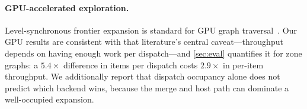 \paragraph{GPU-accelerated exploration.}
Level-synchronous frontier expansion is standard for GPU graph
traversal~\cite{Merrill12}.  Our GPU results are consistent with that
literature's central caveat---throughput depends on having enough work per
dispatch---and \cref{sec:eval} quantifies it for zone graphs: a $5.4\times$
difference in items per dispatch costs $2.9\times$ in per-item throughput.  We
additionally report that dispatch occupancy alone does not predict which backend
wins, because the merge and host path can dominate a well-occupied expansion.

